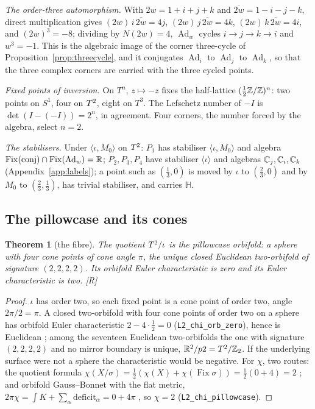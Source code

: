 \documentclass[11pt,a4paper]{article}
\theoremstyle{plain}
\newtheorem{theorem}{Theorem}[section]
\theoremstyle{definition}
\theoremstyle{remark}
\newcommand{\Hquat}{\mathbb{H}}
\newcommand{\Ad}{\operatorname{Ad}}
\newcommand{\Fix}{\operatorname{Fix}}
\newcommand{\rigR}{[\textup{R}]}
\begin{document}
\emph{The order-three automorphism.} With $2w=1+i+j+k$ and $\overline{2w}=1-i-j-k$, direct multiplication gives $(2w)\,i\,\overline{2w}=4j$, $(2w)\,j\,\overline{2w}=4k$, $(2w)\,k\,\overline{2w}=4i$, and $(2w)^{3}=-8$; dividing by $N(2w)=4$, $\Ad_{w}$ cycles $i\to j\to k\to i$ and $w^{3}=-1$. This is the algebraic image of the corner three-cycle of Proposition~\ref{prop:threecycle}, and it conjugates $\Ad_{i}$ to $\Ad_{j}$ to $\Ad_{k}$, so that the three complex corners are carried with the three cycled points.

\emph{Fixed points of inversion.} On $T^{n}$, $z\mapsto-z$ fixes the half-lattice $(\tfrac12\mathbb{Z}/\mathbb{Z})^{n}$: two points on $S^{1}$, four on $T^2$, eight on $T^{3}$. The Lefschetz number of $-I$ is $\det(I-(-I))=2^{n}$, in agreement. Four corners, the number forced by the algebra, select $n=2$.

\emph{The stabilisers.} Under $\langle\iota,M_{0}\rangle$ on $T^2$: $P_{1}$ has stabiliser $\langle\iota,M_{0}\rangle$ and algebra $\Fix(\text{conj})\cap\Fix(\Ad_{w})=\R$; $P_{2},P_{3},P_{4}$ have stabiliser $\langle\iota\rangle$ and algebras $\mathbb{C}_{j},\mathbb{C}_{i},\mathbb{C}_{k}$ (Appendix~\ref{app:labels}); a point such as $(\tfrac13,0)$ is moved by $\iota$ to $(\tfrac23,0)$ and by $M_{0}$ to $(\tfrac23,\tfrac13)$, has trivial stabiliser, and carries $\Hquat$.

\subsection{The pillowcase and its cones}

\begin{theorem}[the fibre]\label{thm:fibre}
The quotient $T^2/\iota$ is the pillowcase orbifold: a sphere with four cone points of cone angle $\pi$, the unique closed Euclidean two-orbifold of signature $(2,2,2,2)$. Its orbifold Euler characteristic is zero and its Euler characteristic is two. \rigR
\end{theorem}

\begin{proof}
$\iota$ has order two, so each fixed point is a cone point of order two, angle $2\pi/2=\pi$. A closed two-orbifold with four cone points of order two on a sphere has orbifold Euler characteristic $2-4\cdot\tfrac12=0$ (\texttt{L2\_chi\_orb\_zero}), hence is Euclidean \cite{Thurston}; among the seventeen Euclidean two-orbifolds the one with signature $(2,2,2,2)$ and no mirror boundary is unique, $\mathbb{R}^{2}/p2=T^2/\mathbb{Z}_2$. If the underlying surface were not a sphere the characteristic would be negative. For $\chi$, two routes: the quotient formula $\chi(X/\sigma)=\tfrac12(\chi(X)+\chi(\Fix\sigma))=\tfrac12(0+4)=2$ \cite{Bredon}; and orbifold Gauss--Bonnet with the flat metric, $2\pi\chi=\int K+\sum_{\alpha}\mathrm{deficit}_{\alpha}=0+4\pi$ \cite{Satake,Kawasaki1978}, so $\chi=2$ (\texttt{L2\_chi\_pillowcase}).
\end{proof}
\end{document}
